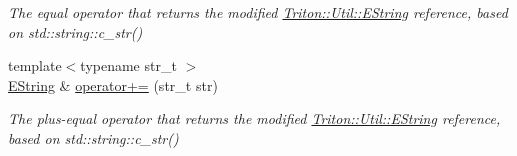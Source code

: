 \begin{DoxyCompactItemize}
\begin{DoxyCompactList}\small\item\em The equal operator that returns the modified \hyperlink{class_triton_1_1_util_1_1_e_string}{Triton\+::\+Util\+::\+E\+String} reference, based on std\+::string\+::c\+\_\+str() \end{DoxyCompactList}\item 
{\footnotesize template$<$typename str\+\_\+t $>$ }\\\hyperlink{class_triton_1_1_util_1_1_e_string}{E\+String} \& \hyperlink{class_triton_1_1_util_1_1_e_string_abca93c45064506416d2761384f17bf01}{operator+=} (str\+\_\+t str)
\begin{DoxyCompactList}\small\item\em The plus-\/equal operator that returns the modified \hyperlink{class_triton_1_1_util_1_1_e_string}{Triton\+::\+Util\+::\+E\+String} reference, based on std\+::string\+::c\+\_\+str() \end{DoxyCompactList}\end{DoxyCompactItemize}
